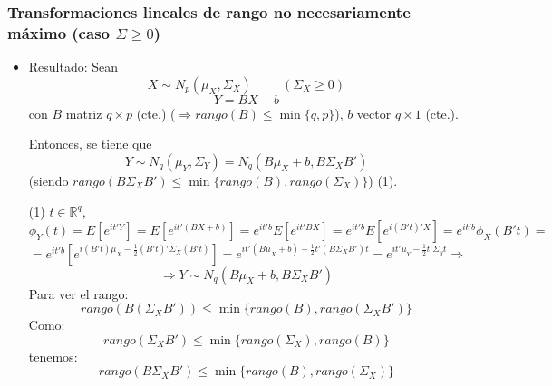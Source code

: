 \documentclass[11pt,a4paper]{article}
\begin{document}
\subsubsection{Transformaciones lineales de rango no necesariamente máximo (caso \texorpdfstring{$\Sigma \geq 0$}))}
\begin{itemize}
\item Resultado: Sean
$$X \sim N_{p}(\mu_{X}, \Sigma_{X}) \hspace{1cm} (\Sigma_{X} \geq 0)$$
$$Y = BX + b$$
con $B$ matriz $q \times p$ (cte.) ($\Rightarrow rango(B) \leq \min\{q, p\}$), $b$ vector $q \times 1$ (cte.).

Entonces, se tiene que
$$Y \sim N_{q}(\mu_{Y}, \Sigma_{Y}) = N_{q}(B\mu_{X} + b, B\Sigma_{X}B')$$
(siendo $rango(B\Sigma_{X}B') \leq \min\{rango(B), rango(\Sigma_{X})\}$) (1).

\item[(1)] $t \in \mathbb{R}^{q}$,
$$\phi_{Y}(t) = E[e^{it'Y}] = E[e^{it'(BX+b)}] = e^{it'b}E[e^{it'BX}] = e^{it'b}E[e^{i(B't)'X}] = e^{it'b}\phi_{X}(B't) =$$
$$= e^{it'b}[e^{i(B't)\mu_{X}-\frac{1}{2}(B't)'\Sigma_{X}(B't)}] = e^{it'(B\mu_{X}+b)-\frac{1}{2}t'(B\Sigma_{X}B')t} = e^{it'\mu_{Y}-\frac{1}{2}t'\Sigma_{y}t} \Rightarrow$$
$$\Rightarrow Y \sim N_{q}(B\mu_{X}+b, B\Sigma_{X}B')$$
Para ver el rango:
$$rango(B(\Sigma_{X}B')) \leq \min\{rango(B), rango(\Sigma_{X}B')\}$$
Como:
$$rango(\Sigma_{X}B') \leq \min\{rango(\Sigma_{X}), rango(B)\}$$
tenemos:
$$rango(B\Sigma_{X}B') \leq \min\{rango(B), rango(\Sigma_{X})\}$$
\end{itemize}
\end{document}
